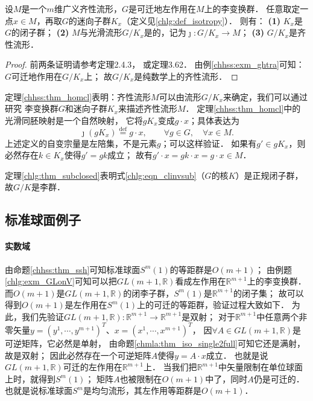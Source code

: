 

\begin{theorem}\label{chhss:thm_homcl}
    设$M$是一个$m$维广义齐性流形，$G$是可迁地左作用在$M$上的李变换群．
    任意取定一点$x \in M$，再取$G$的迷向子群$K_x$（定义见\ref{chlg:def_isotropy}）．
    则有：    
    {\bfseries (1)} $K_x$是$G$的闭子群；    
    {\bfseries (2)} $M$与光滑流形$G/K_x$是的，记为$\jmath : G/K_x \to M$；      
    {\bfseries (3)} $G/K_x$是齐性流形．
\end{theorem}
\begin{proof}
    前两条证明请参考\parencite{helgason-2001}定理2.4.3，
    或\parencite{warner-1983-FDMLG}定理3.62．
    由例\ref{chhss:exm_ghtra}可知：$G$可迁地作用在$G/K_x$上；
    故$G/K_x$是纯数学上的齐性流形．
\end{proof}

定理\ref{chhss:thm_homcl}表明：齐性流形$M$可以由流形$G/K_x$来确定，我们可以通过研究
李变换群$G$和迷向子群$K_x$来描述齐性流形$M$．
定理\ref{chhss:thm_homcl}中的光滑同胚映射是一个{\heiti 自然映射}，
它将$g K_x$变成$g \cdot x$；具体表达为
\begin{equation}\label{chhss:eqn_jnm}
    \jmath(g K_x)\overset{\mathrm {def}}{=}   g\cdot x, \qquad \forall g\in G ,\quad \forall x\in M.
\end{equation}
上述定义的自变宗量是左陪集，不是元素$g$；可以这样验证．
如果有$g'\in g K_x$，则必然存在$k\in K_x$使得$g'=g k$成立；
故有$g'\cdot x = gk\cdot x=g\cdot x \in M$．

定理\ref{chlg:thm_subclosed}表明式\eqref{chlg:eqn_clinvsub}（$G$的核$K$）是正规闭子群，
故$G/K$是李群．





\subsection{标准球面例子}\label{chhss:sec_sphere}
\paragraph{实数域}
由命题\ref{chhss:thm_ssh}可知标准球面$S^m(1)$的等距群是$O(m+1)$；
由例题\ref{chlg:exm_GLonV}可知可以把$GL(m+1,\mathbb{R})$看成左作用在$\mathbb{R}^{m+1}$上的李变换群．
而$O(m+1)$是$GL(m+1,\mathbb{R})$的闭李子群，$S^m(1)$是$\mathbb{R}^{m+1}$的闭子集；
故可以得到$O(m+1)$是左作用在$S^m(1)$上的可迁的等距群，验证过程大致如下．
为此，我们先验证$GL(m+1,\mathbb{R}):\mathbb{R}^{m+1}\to \mathbb{R}^{m+1}$是双射；
对于$\mathbb{R}^{m+1}$中任意两个非零矢量$y=(y^1,\cdots,y^{m+1})^T$、$x=(x^1,\cdots,x^{m+1})^T$，
因$\forall A\in GL(m+1,\mathbb{R})$是可逆矩阵，它必然是单射，
由命题\ref{chmla:thm_iso_single2full}可知它还是满射，故是双射；
因此必然存在一个可逆矩阵$A$使得$y=A\cdot x$成立．
也就是说$GL(m+1,\mathbb{R})${\kaishu 可迁的}左作用在$\mathbb{R}^{m+1}$上．
当我们把$\mathbb{R}^{m+1}$中矢量限制在单位球面上时，就得到$S^m(1)$；
矩阵$A$也被限制在$O(m+1)$中了，同时$A$仍是可迁的．
也就是说标准球面$S^m$是{\kaishu 均匀流形}，其左作用等距群是$O(m+1)$．

